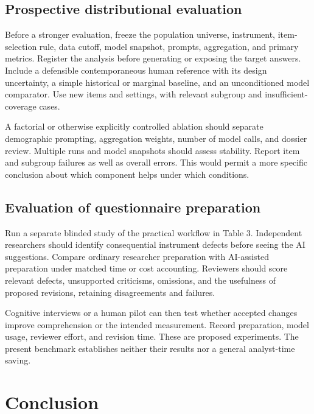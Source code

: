 \documentclass[
  11pt,
]{article}
\let\originalsection\section
\renewcommand{\section}{\Needspace{5\baselineskip}\originalsection}
\begin{document}
\subsection{Prospective distributional
evaluation}\label{prospective-distributional-evaluation}

Before a stronger evaluation, freeze the population universe,
instrument, item-selection rule, data cutoff, model snapshot, prompts,
aggregation, and primary metrics. Register the analysis before
generating or exposing the target answers. Include a defensible
contemporaneous human reference with its design uncertainty, a simple
historical or marginal baseline, and an unconditioned model comparator.
Use new items and settings, with relevant subgroup and
insufficient-coverage cases.

A factorial or otherwise explicitly controlled ablation should separate
demographic prompting, aggregation weights, number of model calls, and
dossier review. Multiple runs and model snapshots should assess
stability. Report item and subgroup failures as well as overall errors.
This would permit a more specific conclusion about which component helps
under which conditions.

\subsection{Evaluation of questionnaire
preparation}\label{evaluation-of-questionnaire-preparation}

Run a separate blinded study of the practical workflow in Table 3.
Independent researchers should identify consequential instrument defects
before seeing the AI suggestions. Compare ordinary researcher
preparation with AI-assisted preparation under matched time or cost
accounting. Reviewers should score relevant defects, unsupported
criticisms, omissions, and the usefulness of proposed revisions,
retaining disagreements and failures.

Cognitive interviews or a human pilot can then test whether accepted
changes improve comprehension or the intended measurement. Record
preparation, model usage, reviewer effort, and revision time. These are
proposed experiments. The present benchmark establishes neither their
results nor a general analyst-time saving.

\section{Conclusion}\label{conclusion}
\end{document}
